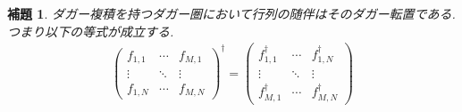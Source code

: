 \documentclass[a4paper,12pt]{ltjsarticle}
\theoremstyle{break}
\newtheorem{lem}[thm]{補題}
\newcommand{\da}{\dagger}
\numberwithin{equation}{section}
\begin{document}
\begin{lem}
  ダガー複積を持つダガー圏において行列の随伴はそのダガー転置である. 
  つまり以下の等式が成立する. 
  \begin{align*} 
      \begin{pmatrix}
      f_{1,1} & \cdots & f_{M,1} \\
      \vdots & \ddots & \vdots \\
      f_{1,N} & \cdots  & f_{M,N}
      \end{pmatrix}^\da
    = 
    \begin{pmatrix}
      f_{1,1}^\da & \cdots & f_{1,N}^\da \\
      \vdots & \ddots & \vdots \\
      f_{M,1}^\da & \cdots  & f_{M,N}^\da
    \end{pmatrix}
  \end{align*}
\end{lem}
\end{document}
